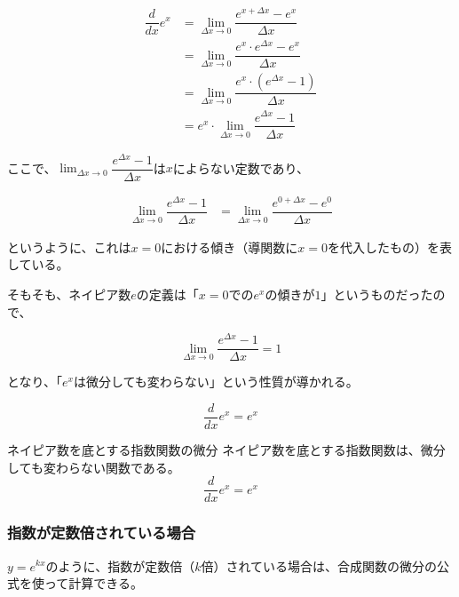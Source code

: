 \documentclass[../math-imaging]{subfiles}
\begin{document}
\begin{align}
  \dfrac{d}{dx}e^x & = \lim_{\Delta x \to 0} \dfrac{e^{x+\Delta x} - e^x}{\Delta x}         \\
                   & = \lim_{\Delta x \to 0} \dfrac{e^x \cdot e^{\Delta x} - e^x}{\Delta x} \\
                   & = \lim_{\Delta x \to 0} \dfrac{e^x \cdot (e^{\Delta x} - 1)}{\Delta x} \\
                   & = e^x \cdot \lim_{\Delta x \to 0} \dfrac{e^{\Delta x} - 1}{\Delta x}
\end{align}

ここで、$\displaystyle\lim_{\Delta x \to 0} \dfrac{e^{\Delta x} - 1}{\Delta x}$は$x$によらない定数であり、

\begin{align}
  \lim_{\Delta x \to 0} \dfrac{e^{\Delta x} - 1}{\Delta x} & = \lim_{\Delta x \to 0} \dfrac{e^{0 + \Delta x} - e^0}{\Delta x}
\end{align}

というように、これは$x=0$における傾き（導関数に$x=0$を代入したもの）を表している。

そもそも、ネイピア数$e$の定義は「$x=0$での$e^x$の傾きが$1$」というものだったので、

\begin{equation}
  \lim_{\Delta x \to 0} \dfrac{e^{\Delta x} - 1}{\Delta x} = 1
\end{equation}

となり、「$e^x$は微分しても変わらない」という性質が導かれる。

\begin{equation}
  \dfrac{d}{dx}e^x = e^x
\end{equation}

\begin{theorem}{ネイピア数を底とする指数関数の微分}
  \newline
  ネイピア数を底とする指数関数は、微分しても変わらない関数である。
  \LARGE
  \begin{equation}
    \dfrac{d}{dx}e^x = e^x
  \end{equation}
\end{theorem}

\subsubsection{指数が定数倍されている場合}

$y = e^{kx}$のように、指数が定数倍（$k$倍）されている場合は、合成関数の微分の公式を使って計算できる。
\end{document}
